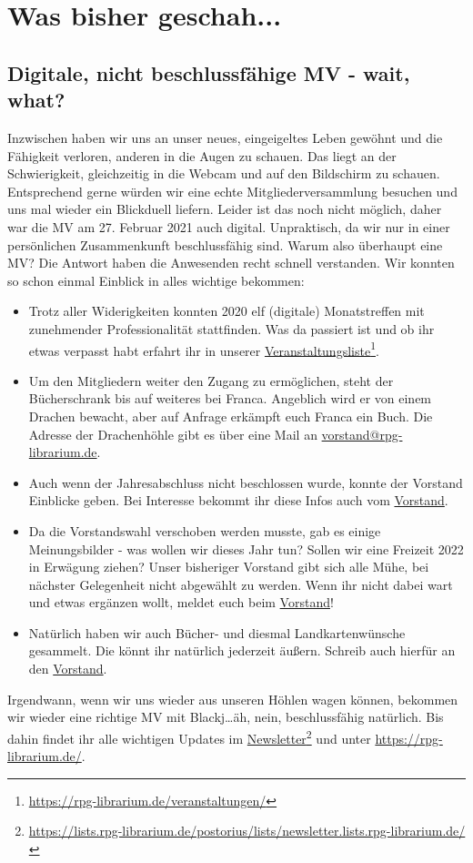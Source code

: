\documentclass[final]{multiversum}
\newcommand\fnref[2]{\href{#1}{#2}\footnote{\url{#1}}}
\begin{document}
\makemultititle
%

\section{Was bisher geschah...}

\subsection{Digitale, nicht beschlussfähige MV - wait, what?}
Inzwischen haben wir uns an unser neues, eingeigeltes Leben gewöhnt und die Fähigkeit verloren, anderen in die Augen zu schauen.
Das liegt an der Schwierigkeit, gleichzeitig in die Webcam und auf den Bildschirm zu schauen.
Entsprechend gerne würden wir eine echte Mitgliederversammlung besuchen und uns mal wieder ein Blickduell liefern. 
Leider ist das noch nicht möglich, daher war die MV am 27. Februar 2021 auch digital. 
Unpraktisch, da wir nur in einer persönlichen Zusammenkunft beschlussfähig sind.
Warum also überhaupt eine MV?
Die Antwort haben die Anwesenden recht schnell verstanden.
Wir konnten so schon einmal Einblick in alles wichtige bekommen:
\begin{itemize}
\item Trotz aller Widerigkeiten konnten 2020 elf (digitale) Monatstreffen mit zunehmender Professionalität stattfinden.
Was da passiert ist und ob ihr etwas verpasst habt erfahrt ihr in unserer \fnref{https://rpg-librarium.de/veranstaltungen/}{Veranstaltungsliste}.
\item Um den Mitgliedern weiter den Zugang zu ermöglichen, steht der Bücherschrank bis auf weiteres bei Franca. 
Angeblich wird er von einem Drachen bewacht, aber auf Anfrage erkämpft euch Franca ein Buch. 
Die Adresse der Drachenhöhle gibt es über eine Mail an \href{mailto:vorstand@rpg-librarium.de}{vorstand@rpg-librarium.de}.
\item Auch wenn der Jahresabschluss nicht beschlossen wurde, konnte der Vorstand Einblicke geben. 
Bei Interesse bekommt ihr diese Infos auch vom \href{mailto:vorstand@rpg-librarium.de}{Vorstand}.
\item Da die Vorstandswahl verschoben werden musste, gab es einige Meinungsbilder - was wollen wir dieses Jahr tun? 
Sollen wir eine Freizeit 2022 in Erwägung ziehen? 
Unser bisheriger Vorstand gibt sich alle Mühe, bei nächster Gelegenheit nicht abgewählt zu werden. 
Wenn ihr nicht dabei wart und etwas ergänzen wollt, meldet euch beim \href{mailto:vorstand@rpg-librarium.de}{Vorstand}!
\item Natürlich haben wir auch Bücher- und diesmal Landkartenwünsche gesammelt.
Die könnt ihr natürlich jederzeit äußern. Schreib auch hierfür an den \href{mailto:vorstand@rpg-librarium.de}{Vorstand}.
\end{itemize}
Irgendwann, wenn wir uns wieder aus unseren Höhlen wagen können, bekommen wir wieder eine richtige MV mit Blackj\dots äh, nein, beschlussfähig natürlich. 
Bis dahin findet ihr alle wichtigen Updates im \fnref{https://lists.rpg-librarium.de/postorius/lists/newsletter.lists.rpg-librarium.de/}{Newsletter} und unter \href{https://rpg-librarium.de/}{https://rpg-librarium.de/}.
\end{document}
